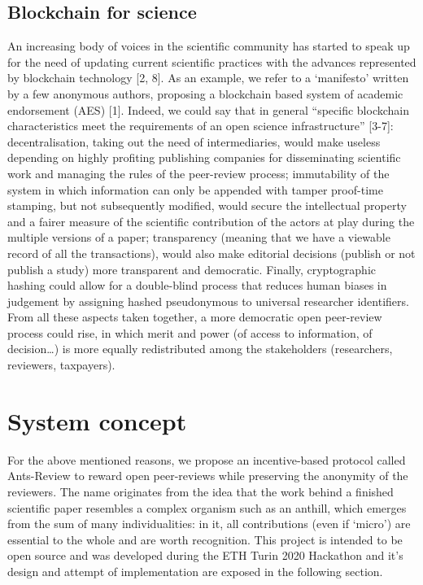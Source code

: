 \documentclass[runningheads]{llncs}
\begin{document}
\subsection{Blockchain for science}
An increasing body of voices in the scientific community has started to speak up for the need of updating current scientific practices with the advances represented by blockchain technology [2, 8]. As an example, we refer to a ‘manifesto’ written by a few anonymous authors, proposing a blockchain based system of academic endorsement (AES) [1]. Indeed, we could say that in general “specific blockchain characteristics meet the requirements of an open science infrastructure” [3-7]: decentralisation, taking out the need of intermediaries, would make useless depending on highly profiting publishing companies for disseminating scientific work and managing the rules of the peer-review process; immutability of the system in which information can only be appended with tamper proof-time stamping,  but not subsequently modified, would secure the intellectual property and a fairer measure of the scientific contribution of the actors at play during the multiple versions of a paper; transparency (meaning that we have a viewable record of all the transactions), would also make editorial decisions (publish or not publish a study) more transparent and democratic. Finally, cryptographic hashing could allow for a double-blind process that reduces human biases in judgement by assigning hashed pseudonymous to universal researcher identifiers. From all these aspects taken together, a more democratic open peer-review  process could rise, in which merit and power (of access to information, of decision…) is more equally redistributed among the stakeholders (researchers, reviewers, taxpayers).

\section{System concept}
For the above mentioned reasons, we propose an incentive-based protocol called Ants-Review to reward open peer-reviews while preserving the anonymity of the reviewers. The name originates from the idea that the work behind a finished scientific paper resembles a complex organism such as an anthill, which emerges from the sum of many individualities: in it, all contributions (even if ‘micro’) are essential to the whole and are worth recognition.
This project is intended to be open source and was developed during the ETH Turin 2020 Hackathon and it’s design and attempt of implementation are exposed in the following section.
\end{document}
